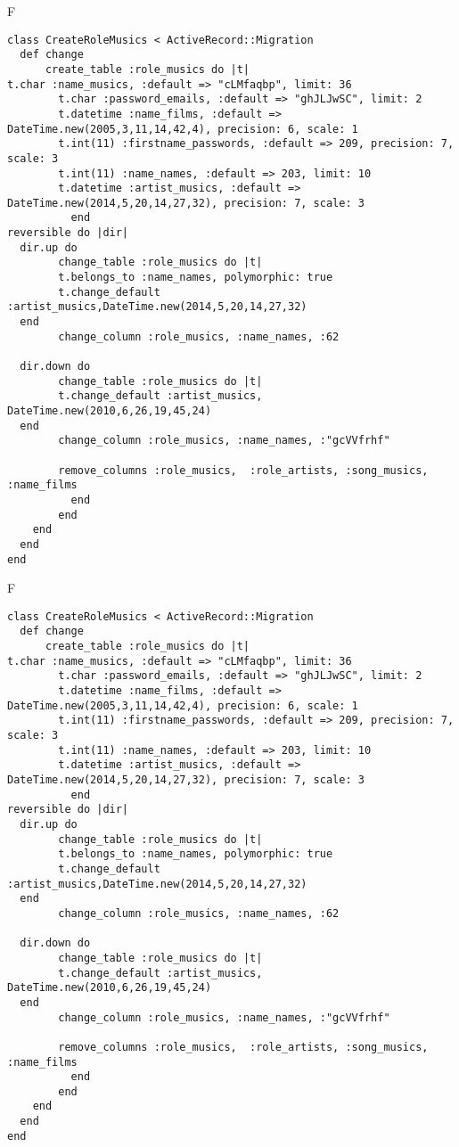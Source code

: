 F
\begin{verbatim}
class CreateRoleMusics < ActiveRecord::Migration
  def change
	  create_table :role_musics do |t|
t.char :name_musics, :default => "cLMfaqbp", limit: 36
		t.char :password_emails, :default => "ghJLJwSC", limit: 2
		t.datetime :name_films, :default => DateTime.new(2005,3,11,14,42,4), precision: 6, scale: 1
		t.int(11) :firstname_passwords, :default => 209, precision: 7, scale: 3
		t.int(11) :name_names, :default => 203, limit: 10
		t.datetime :artist_musics, :default => DateTime.new(2014,5,20,14,27,32), precision: 7, scale: 3
		  end
reversible do |dir|
  dir.up do
		change_table :role_musics do |t|
		t.belongs_to :name_names, polymorphic: true
 		t.change_default :artist_musics,DateTime.new(2014,5,20,14,27,32)
  end
 		change_column :role_musics, :name_names, :62
   
  dir.down do
		change_table :role_musics do |t|
		t.change_default :artist_musics, DateTime.new(2010,6,26,19,45,24)
  end
 		change_column :role_musics, :name_names, :"gcVVfrhf"
   
		remove_columns :role_musics,  :role_artists, :song_musics, :name_films 
	      end
	    end
    end 
  end
end

\end{verbatim}

F
\begin{verbatim}
class CreateRoleMusics < ActiveRecord::Migration
  def change
	  create_table :role_musics do |t|
t.char :name_musics, :default => "cLMfaqbp", limit: 36
		t.char :password_emails, :default => "ghJLJwSC", limit: 2
		t.datetime :name_films, :default => DateTime.new(2005,3,11,14,42,4), precision: 6, scale: 1
		t.int(11) :firstname_passwords, :default => 209, precision: 7, scale: 3
		t.int(11) :name_names, :default => 203, limit: 10
		t.datetime :artist_musics, :default => DateTime.new(2014,5,20,14,27,32), precision: 7, scale: 3
		  end
reversible do |dir|
  dir.up do
		change_table :role_musics do |t|
		t.belongs_to :name_names, polymorphic: true
 		t.change_default :artist_musics,DateTime.new(2014,5,20,14,27,32)
  end
 		change_column :role_musics, :name_names, :62
   
  dir.down do
		change_table :role_musics do |t|
		t.change_default :artist_musics, DateTime.new(2010,6,26,19,45,24)
  end
 		change_column :role_musics, :name_names, :"gcVVfrhf"
   
		remove_columns :role_musics,  :role_artists, :song_musics, :name_films 
	      end
	    end
    end 
  end
end

\end{verbatim}

